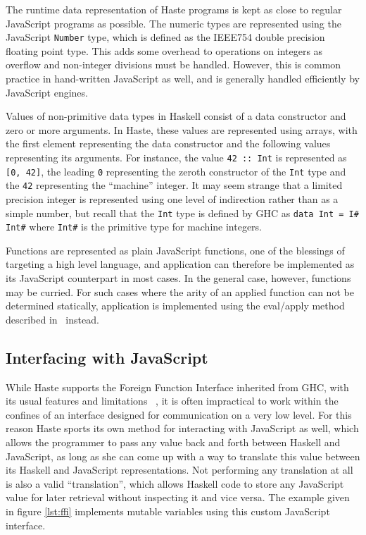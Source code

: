 \documentclass[preprint]{sigplanconf}
\begin{document}
The runtime data representation of Haste programs is kept as close to regular
JavaScript programs as possible. The numeric types are represented using the
JavaScript \lstinline!Number! type, which is defined as the IEEE754 double
precision floating point type. This adds some overhead to operations on
integers as overflow and non-integer divisions must be handled. However, this
is common practice in hand-written JavaScript as well, and is generally handled
efficiently by JavaScript engines.

Values of non-primitive data types in Haskell consist of a data constructor and
zero or more arguments. In Haste, these values are represented using arrays,
with the first element representing the data constructor and the following
values representing its arguments. For instance, the value \lstinline!42 :: Int!
is represented as \lstinline![0, 42]!, the leading \lstinline!0! representing
the zeroth constructor of the \lstinline!Int! type and the \lstinline!42!
representing the ``machine'' integer. It may seem strange that a limited
precision integer is represented using one level of indirection rather
than as a simple number, but recall that the \lstinline!Int! type is defined by
GHC as \lstinline!data Int = I# Int#! where \lstinline!Int#! is the primitive
type for machine integers.

Functions are represented as plain JavaScript functions, one of the blessings
of targeting a high level language, and application can therefore be
implemented as its JavaScript counterpart in most cases. In the general case,
however, functions may be curried. For such cases where the arity of an applied
function can not be determined statically, application is implemented using the
eval/apply method described in\ \cite{fastcurry} instead.

\subsection{Interfacing with JavaScript}

While Haste supports the Foreign Function Interface inherited from GHC, with
its usual features and limitations \ \cite{ffi}, it is often impractical to
work within the confines of an interface designed for communication on a very
low level. For this reason Haste sports its own method for interacting with
JavaScript as well, which allows the programmer to pass any value back and
forth between Haskell and JavaScript, as long as she can come up with a way to
translate this value between its Haskell and JavaScript representations. Not
performing any translation at all is also a valid ``translation'', which allows
Haskell code to store any JavaScript value for later retrieval without
inspecting it and vice versa. The example given in figure \ref{lst:ffi}
implements mutable variables using this custom JavaScript interface.
\end{document}
